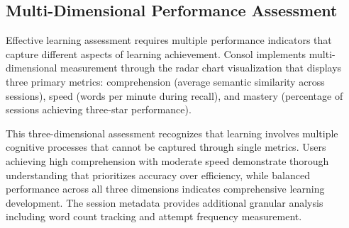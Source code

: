 \subsection{Multi-Dimensional Performance Assessment}
\label{multi_dimensional_performance_assessment}


Effective learning assessment requires multiple performance indicators that capture different aspects of learning achievement. Consol implements multi-dimensional measurement through the radar chart visualization that displays three primary metrics: comprehension (average semantic similarity across sessions), speed (words per minute during recall), and mastery (percentage of sessions achieving three-star performance).

This three-dimensional assessment recognizes that learning involves multiple cognitive processes that cannot be captured through single metrics. Users achieving high comprehension with moderate speed demonstrate thorough understanding that prioritizes accuracy over efficiency, while balanced performance across all three dimensions indicates comprehensive learning development. The session metadata provides additional granular analysis including word count tracking and attempt frequency measurement.






